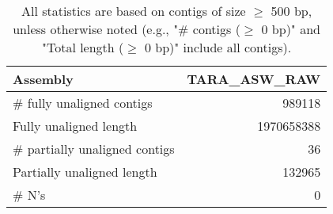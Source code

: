 \documentclass[12pt,a4paper]{article}
\begin{document}
\begin{table}[ht]
\begin{center}
\caption{All statistics are based on contigs of size $\geq$ 500 bp, unless otherwise noted (e.g., "\# contigs ($\geq$ 0 bp)" and "Total length ($\geq$ 0 bp)" include all contigs).}
\begin{tabular}{|l*{1}{|r}|}
\hline
Assembly & TARA\_ASW\_RAW \\ \hline
\# fully unaligned contigs & 989118 \\ \hline
Fully unaligned length & 1970658388 \\ \hline
\# partially unaligned contigs & 36 \\ \hline
Partially unaligned length & 132965 \\ \hline
\# N's & 0 \\ \hline
\end{tabular}
\end{center}
\end{table}
\end{document}
